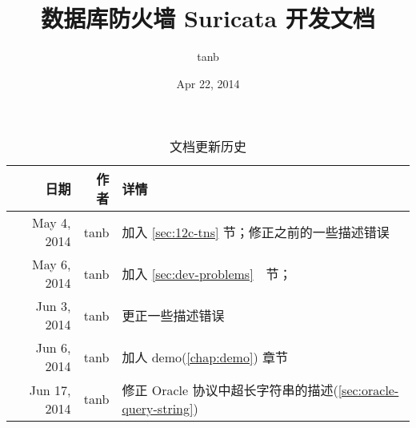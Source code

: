 \documentclass{book}
\title{\hsf 数据库防火墙 Suricata 开发文档}
\author{tanb}
\date{Apr 22, 2014}
\begin{document}
\maketitle

\begin{table}[!h]
    \centering
    \caption{文档更新历史}
    \begin{tabular}{|>{\scriptsize}r|>{\scriptsize}r|>{\scriptsize}p{6cm}|} \hline
        日期        & 作者 & 详情    \\ \hline\hline
        May 4, 2014 & tanb & 加入 \ref{sec:12c-tns} 节；修正之前的一些描述错误 \\\hline
        May 6, 2014 & tanb & 加入 \ref{sec:dev-problems}　节； \\\hline
        Jun 3, 2014 & tanb & 更正一些描述错误 \\\hline
        Jun 6, 2014 & tanb & 加人 demo(\ref{chap:demo}) 章节 \\\hline
        Jun 17, 2014 & tanb & 修正 Oracle 协议中超长字符串的描述(\ref{sec:oracle-query-string}) \\\hline
    \end{tabular}
    \label{tab:update-hist}
\end{table}

\tableofcontents





%
\end{document}
